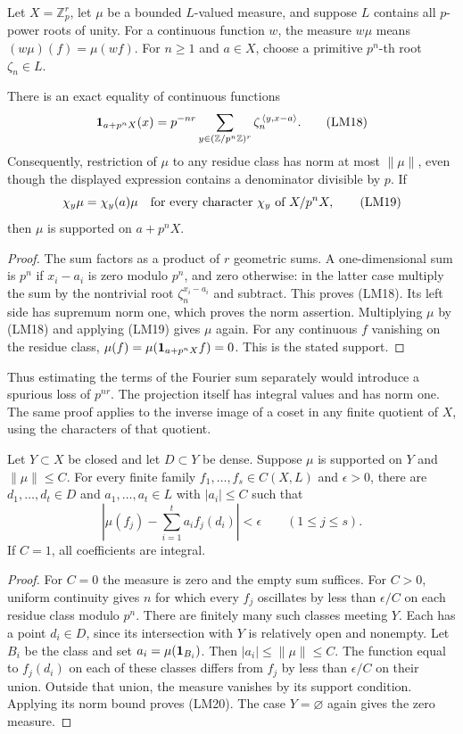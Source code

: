 Let $X=\mathbb Z_p^r$, let $\mu$ be a bounded $L$-valued
measure, and suppose $L$ contains all $p$-power roots of unity.
For a continuous function $w$, the measure $w\mu$ means
$(w\mu)(f)=\mu(wf)$.  For $n\ge1$ and $a\in X$, choose a
primitive $p^n$-th root $\zeta_n\in L$.

\begin{lemma}\label{lm-character-projection}
There is an exact equality of continuous functions
\[
 {\bf1}_{a+p^nX}(x)=p^{-nr}
     \sum_{y\in(\mathbb Z/p^n\mathbb Z)^r}
                       \zeta_n^{\,\langle y,x-a\rangle}.
 \tag{LM18}
\]
Consequently, restriction of $\mu$ to any residue class has
norm at most $\|\mu\|$, even though the displayed expression
contains a denominator divisible by $p$.
If
\[
       \chi_y\mu=\chi_y(a)\mu
       \quad\hbox{for every character }\chi_y
               \hbox{ of }X/p^nX,
 \tag{LM19}
\]
then $\mu$ is supported on $a+p^nX$.
\end{lemma}
\begin{proof}
The sum factors as a product of $r$ geometric sums.
A one-dimensional sum is $p^n$ if $x_i-a_i$ is zero
modulo $p^n$, and zero otherwise: in the latter case multiply
the sum by the nontrivial root $\zeta_n^{x_i-a_i}$ and subtract.
This proves (LM18).  Its left side has supremum norm one,
which proves the norm assertion.
Multiplying $\mu$ by (LM18) and applying (LM19) gives $\mu$
again.  For any continuous $f$ vanishing on the residue class,
$\mu(f)=\mu({\bf1}_{a+p^nX}f)=0$.  This is the stated support.
\end{proof}

Thus estimating the terms of the Fourier sum separately would
introduce a spurious loss of $p^{nr}$.  The projection itself
has integral values and has norm one.  The same proof applies
to the inverse image of a coset in any finite quotient of $X$,
using the characters of that quotient.

\begin{theorem}\label{lm-finite-approximation}
Let $Y\subset X$ be closed and let $D\subset Y$ be dense.
Suppose $\mu$ is supported on $Y$ and $\|\mu\|\le C$.
For every finite family $f_1,\ldots,f_s\in C(X,L)$ and
$\epsilon>0$, there are $d_1,\ldots,d_t\in D$ and
$a_1,\ldots,a_t\in L$ with $|a_i|\le C$ such that
\[
 \left|\mu(f_j)-\sum_{i=1}^t a_if_j(d_i)\right|<\epsilon
                             \qquad(1\le j\le s).
 \tag{LM20}
\]
If $C=1$, all coefficients are integral.
\end{theorem}
\begin{proof}
For $C=0$ the measure is zero and the empty sum suffices.
For $C>0$, uniform continuity gives $n$ for which every $f_j$
oscillates by less than $\epsilon/C$ on each residue class
modulo $p^n$.  There are finitely many such classes meeting
$Y$.  Each has a point $d_i\in D$, since its intersection
with $Y$ is relatively open and nonempty.  Let $B_i$ be the
class and set $a_i=\mu({\bf1}_{B_i})$.
Then $|a_i|\le\|\mu\|\le C$.
The function equal to $f_j(d_i)$ on each of these classes
differs from $f_j$ by less than $\epsilon/C$ on their union.
Outside that union, the measure vanishes by its support
condition.  Applying its norm bound proves (LM20).
The case $Y=\varnothing$ again gives the zero measure.
\end{proof}


